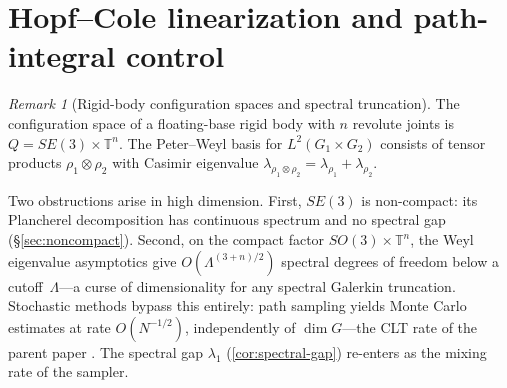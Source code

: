 \documentclass[12pt]{amsart}
\theoremstyle{definition}
\theoremstyle{remark}
\newtheorem*{remark}{Remark}
\newcommand{\bT}{\mathbb{T}}
\begin{document}
\section{Hopf--Cole linearization and path-integral control}\label{sec:mppi}

\begin{remark}[Rigid-body configuration spaces and spectral truncation]
The configuration space of a floating-base rigid body with $n$ revolute joints is $Q = SE(3) \times \bT^n$. The Peter--Weyl basis for $L^2(G_1 \times G_2)$ consists of tensor products $\rho_1 \otimes \rho_2$ with Casimir eigenvalue $\lambda_{\rho_1 \otimes \rho_2} = \lambda_{\rho_1} + \lambda_{\rho_2}$.

Two obstructions arise in high dimension. First, $SE(3)$ is non-compact: its Plancherel decomposition has continuous spectrum and no spectral gap (\S\ref{sec:noncompact}). Second, on the compact factor $SO(3) \times \bT^n$, the Weyl eigenvalue asymptotics give $O(\Lambda^{(3+n)/2})$ spectral degrees of freedom below a cutoff~$\Lambda$---a curse of dimensionality for any spectral Galerkin truncation. Stochastic methods bypass this entirely: path sampling yields Monte Carlo estimates at rate $O(N^{-1/2})$, independently of $\dim G$---the CLT rate of the parent paper \cite{OCT}. The spectral gap $\lambda_1$ (\cref{cor:spectral-gap}) re-enters as the mixing rate of the sampler.
\end{remark}
\end{document}
